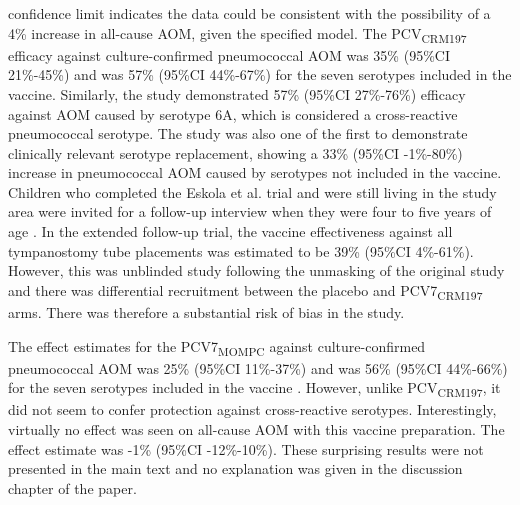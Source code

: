 \documentclass[]{book}
\theoremstyle{definition}
\theoremstyle{definition}
\theoremstyle{definition}
\theoremstyle{remark}
\begin{document}
confidence limit indicates the data could be consistent with the
possibility of a 4\% increase in all-cause AOM, given the specified
model. The PCV\textsubscript{CRM197} efficacy against culture-confirmed
pneumococcal AOM was 35\% (95\%CI 21\%-45\%) and was 57\% (95\%CI
44\%-67\%) for the seven serotypes included in the vaccine. Similarly,
the study demonstrated 57\% (95\%CI 27\%-76\%) efficacy against AOM
caused by serotype 6A, which is considered a cross-reactive pneumococcal
serotype. The study was also one of the first to demonstrate clinically
relevant serotype replacement, showing a 33\% (95\%CI -1\%-80\%)
increase in pneumococcal AOM caused by serotypes not included in the
vaccine. Children who completed the Eskola et al. trial and were still
living in the study area were invited for a follow-up interview when
they were four to five years of age \citep{Palmu2004}. In the extended
follow-up trial, the vaccine effectiveness against all tympanostomy tube
placements was estimated to be 39\% (95\%CI 4\%-61\%). However, this was
unblinded study following the unmasking of the original study and there
was differential recruitment between the placebo and
PCV7\textsubscript{CRM197} arms. There was therefore a substantial risk
of bias in the study.

The effect estimates for the PCV7\textsubscript{MOMPC} against
culture-confirmed pneumococcal AOM was 25\% (95\%CI 11\%-37\%) and was
56\% (95\%CI 44\%-66\%) for the seven serotypes included in the vaccine
\citep{Kilpi2003}. However, unlike PCV\textsubscript{CRM197}, it did not
seem to confer protection against cross-reactive serotypes.
Interestingly, virtually no effect was seen on all-cause AOM with this
vaccine preparation. The effect estimate was -1\% (95\%CI -12\%-10\%).
These surprising results were not presented in the main text and no
explanation was given in the discussion chapter of the paper.
\end{document}
